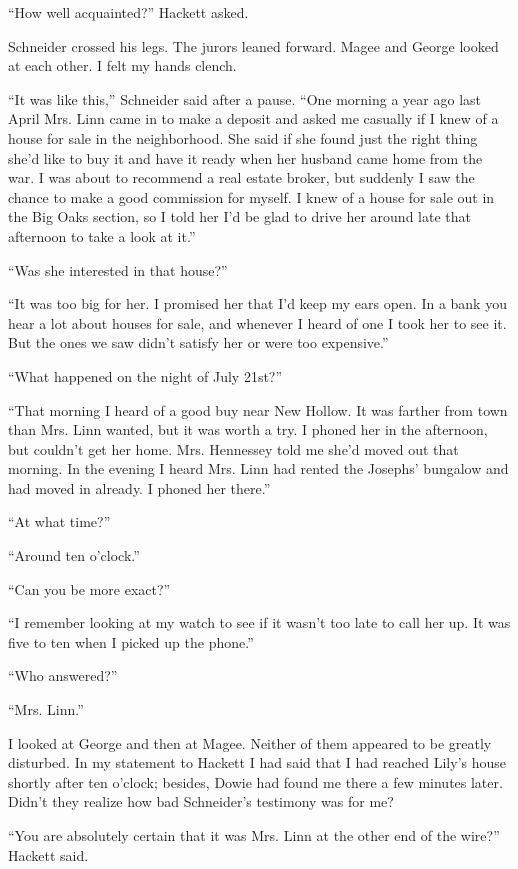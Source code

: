 \documentclass{novel}
\begin{document}
“How well acquainted?” Hackett asked.

Schneider crossed his legs. The jurors leaned forward. Magee and George looked at each other. I felt my hands clench.

“It was like this,” Schneider said after a pause. “One morning a year ago last April Mrs. Linn came in to make a deposit and asked me casually if I knew of a house for sale in the neighborhood. She said if she found just the right thing she’d like to buy it and have it ready when her husband came home from the war. I was about to recommend a real estate broker, but suddenly I saw the chance to make a good commission for myself. I knew of a house for sale out in the Big Oaks section, so I told her I’d be glad to drive her around late that afternoon to take a look at it.”

“Was she interested in that house?”

“It was too big for her. I promised her that I’d keep my ears open. In a bank you hear a lot about houses for sale, and whenever I heard of one I took her to see it. But the ones we saw didn’t satisfy her or were too expensive.”

“What happened on the night of July 21st?”

“That morning I heard of a good buy near New Hollow. It was farther from town than Mrs. Linn wanted, but it was worth a try. I phoned her in the afternoon, but couldn’t get her home. Mrs. Hennessey told me she’d moved out that morning. In the evening I heard Mrs. Linn had rented the Josephs’ bungalow and had moved in already. I phoned her there.”

“At what time?”

“Around ten o’clock.”

“Can you be more exact?”

“I remember looking at my watch to see if it wasn’t too late to call her up. It was five to ten when I picked up the phone.”

“Who answered?”

“Mrs. Linn.”

I looked at George and then at Magee. Neither of them appeared to be greatly disturbed. In my statement to Hackett I had said that I had reached Lily’s house shortly after ten o’clock; besides, Dowie had found me there a few minutes later. Didn’t they realize how bad Schneider’s testimony was for me?

“You are absolutely certain that it was Mrs. Linn at the other end of the wire?” Hackett said.
\end{document}
